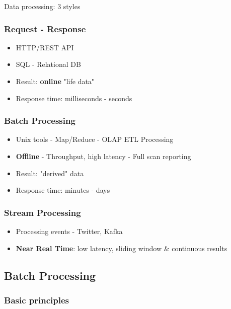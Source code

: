 \documentclass{article}
\begin{document}
Data processing: 3 styles

\subsubsection{Request - Response}

\begin{itemize}
    \item HTTP/REST API
    \item SQL - Relational DB
    \item Result: \textbf{online} "life data"
    \item Response time: milliseconds - seconds
\end{itemize}

\subsubsection{Batch Processing}

\begin{itemize}
    \item Unix tools - Map/Reduce - OLAP ETL Processing
    \item \textbf{Offline} - Throughput, high latency - Full scan reporting
    \item Result: "derived" data
    \item Response time: minutes - days
\end{itemize}

\subsubsection{Stream Processing}

\begin{itemize}
    \item Processing events - Twitter, Kafka
    \item \textbf{Near Real Time}: low latency, sliding window \& continuous results
\end{itemize}

\subsection{Batch Processing}

\subsubsection{Basic principles}
\end{document}
